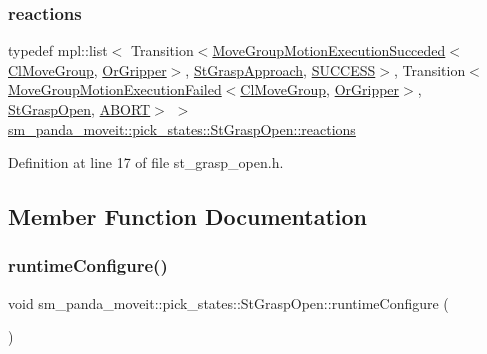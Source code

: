 \subsubsection{\texorpdfstring{reactions}{reactions}}
{\footnotesize\ttfamily typedef mpl\+::list$<$ Transition$<$\hyperlink{structmoveit__z__client_1_1MoveGroupMotionExecutionSucceded}{Move\+Group\+Motion\+Execution\+Succeded}$<$\hyperlink{classmoveit__z__client_1_1ClMoveGroup}{Cl\+Move\+Group}, \hyperlink{classsm__panda__moveit_1_1OrGripper}{Or\+Gripper}$>$, \hyperlink{structsm__panda__moveit_1_1pick__states_1_1StGraspApproach}{St\+Grasp\+Approach}, \hyperlink{classSUCCESS}{S\+U\+C\+C\+E\+SS}$>$, Transition$<$\hyperlink{structmoveit__z__client_1_1MoveGroupMotionExecutionFailed}{Move\+Group\+Motion\+Execution\+Failed}$<$\hyperlink{classmoveit__z__client_1_1ClMoveGroup}{Cl\+Move\+Group}, \hyperlink{classsm__panda__moveit_1_1OrGripper}{Or\+Gripper}$>$, \hyperlink{structsm__panda__moveit_1_1pick__states_1_1StGraspOpen}{St\+Grasp\+Open}, \hyperlink{classABORT}{A\+B\+O\+RT}$>$ $>$ \hyperlink{structsm__panda__moveit_1_1pick__states_1_1StGraspOpen_a02a356537b3f5259fe38bbeed6c6682b}{sm\+\_\+panda\+\_\+moveit\+::pick\+\_\+states\+::\+St\+Grasp\+Open\+::reactions}}



Definition at line 17 of file st\+\_\+grasp\+\_\+open.\+h.



\subsection{Member Function Documentation}
\mbox{\label{structsm__panda__moveit_1_1pick__states_1_1StGraspOpen_a1b53e0d7cd590d9da83164133bf17caf}} 
\subsubsection{\texorpdfstring{runtime\+Configure()}{runtimeConfigure()}}
{\footnotesize\ttfamily void sm\+\_\+panda\+\_\+moveit\+::pick\+\_\+states\+::\+St\+Grasp\+Open\+::runtime\+Configure (\begin{DoxyParamCaption}{ }\end{DoxyParamCaption})\hspace{0.3cm}{\ttfamily [inline]}}



